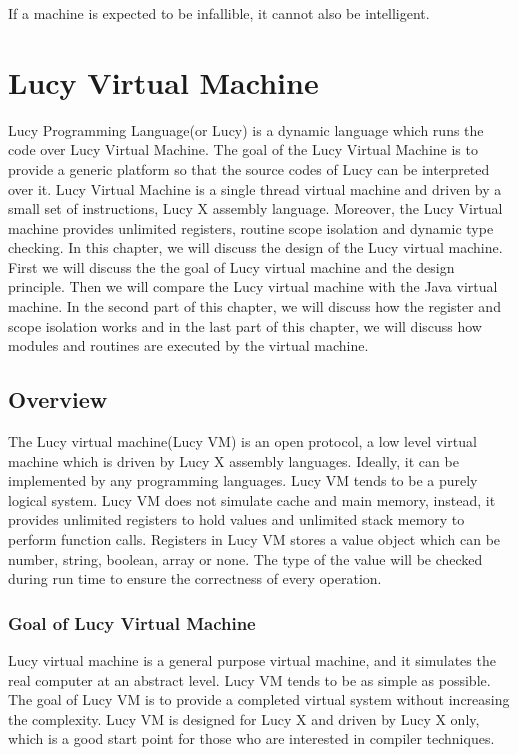\begin{savequote}[75mm]
If a machine is expected to be infallible, it cannot also be intelligent.
\end{savequote}

\chapter{Lucy Virtual Machine}
Lucy Programming Language(or Lucy) is a dynamic language which runs the code over Lucy Virtual Machine. The goal of the Lucy Virtual Machine is to provide a generic platform so that the source codes of Lucy can be interpreted over it. Lucy Virtual Machine is a single thread virtual machine and driven by a small set of instructions, Lucy X assembly language. Moreover, the Lucy Virtual machine provides unlimited registers, routine scope isolation and dynamic type checking. In this chapter, we will discuss the design of the Lucy virtual machine. First we will discuss the the goal of Lucy virtual machine and the design principle. Then we will compare the Lucy virtual machine with the Java virtual machine. In the second part of this chapter, we will discuss how the register and scope isolation works and in the last part of this chapter, we will discuss how modules and routines are executed by the virtual machine.

\section{Overview}
The Lucy virtual machine(Lucy VM) is an open protocol, a low level virtual machine which is driven by Lucy X assembly languages. Ideally, it can be implemented by any programming languages. Lucy VM tends to be a purely logical system. Lucy VM does not simulate cache and main memory, instead, it provides unlimited registers to hold values and unlimited stack memory to perform function calls. Registers in Lucy VM stores a value object which can be number, string, boolean, array or none. The type of the value will be checked during run time to ensure the correctness of every operation.

\subsection{Goal of Lucy Virtual Machine}
Lucy virtual machine is a general purpose virtual machine, and it simulates the real computer at an abstract level. Lucy VM tends to be as simple as possible. The goal of Lucy VM is to provide a completed virtual system without increasing the complexity. Lucy VM is designed for Lucy X and driven by Lucy X only, which is a good start point for those who are interested in compiler techniques.

